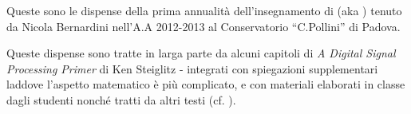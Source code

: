 %
%

Queste sono le dispense della prima annualit\`a dell'insegnamento di \emph{\topic}
(aka \emph{\topicacro}) tenuto da Nicola Bernardini nell'A.A 2012-2013 al
Conservatorio ``C.Pollini'' di Padova.

Queste dispense sono tratte in larga parte da alcuni capitoli di \emph{A Digital Signal Processing Primer}
di Ken Steiglitz \cite{steiglitz:adspp} - integrati
con spiegazioni supplementari laddove l'aspetto matematico \`e pi\`u
complicato, e con materiali elaborati in
classe dagli studenti
nonch\'e tratti da altri testi
(cf. \cite{steiglitz1974introduction, t1987digital, park2010introduction, shenoi2005introduction}).
